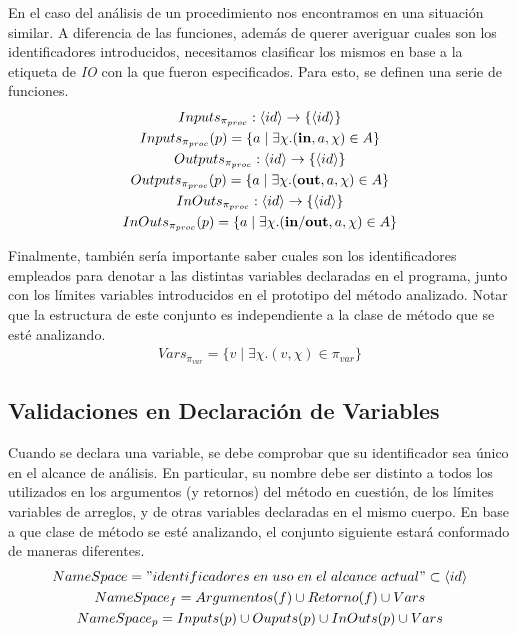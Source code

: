 \documentclass{article}
\begin{document}
En el caso del análisis de un procedimiento nos encontramos en una situación similar.
A diferencia de las funciones, además de querer averiguar cuales son los identificadores introducidos, necesitamos clasificar los mismos en base a la etiqueta de \textit{IO} con la que fueron especificados.
Para esto, se definen una serie de funciones.
\begin{gather*}
Inputs_{\pi_{proc}}: \langle id \rangle \rightarrow \{ \langle id \rangle \}
\\
Inputs_{\pi_{proc}}(p) = \{ a \mid \exists \chi. (\mathbf{in}, a, \chi) \in A \}
\\
Outputs_{\pi_{proc}}: \langle id \rangle \rightarrow \{ \langle id \rangle \}
\\
Outputs_{\pi_{proc}}(p) = \{ a \mid \exists \chi. (\mathbf{out}, a, \chi) \in A \}
\\
InOuts_{\pi_{proc}}: \langle id \rangle \rightarrow \{ \langle id \rangle \}
\\
InOuts_{\pi_{proc}}(p) = \{ a \mid \exists \chi. (\mathbf{in/out}, a, \chi) \in A \}
\end{gather*}

Finalmente, también sería importante saber cuales son los identificadores empleados para denotar a las distintas variables declaradas en el programa, junto con los límites variables introducidos en el prototipo del método analizado.
Notar que la estructura de este conjunto es independiente a la clase de método que se esté analizando.
\begin{gather*}
Vars_{\pi_{var}} = \{ v \mid \exists \chi. (v, \chi) \in \pi_{var} \}
\end{gather*}

\subsection{Validaciones en Declaración de Variables}

Cuando se declara una variable, se debe comprobar que su identificador sea único en el alcance de análisis.
En particular, su nombre debe ser distinto a todos los utilizados en los argumentos (y retornos) del método en cuestión, de los límites variables de arreglos, y de otras variables declaradas en el mismo cuerpo.
En base a que clase de método se esté analizando, el conjunto siguiente estará conformado de maneras diferentes.
\begin{gather*}
NameSpace =
"identificadores \; en \; uso \; en \; el \; alcance \; actual" 
\subset \langle id \rangle
\\
NameSpace_f =
Argumentos(f) \cup Retorno(f) \cup Vars
\\
NameSpace_p =
Inputs(p) \cup Ouputs(p) \cup InOuts(p) \cup Vars
\end{gather*}
\end{document}
